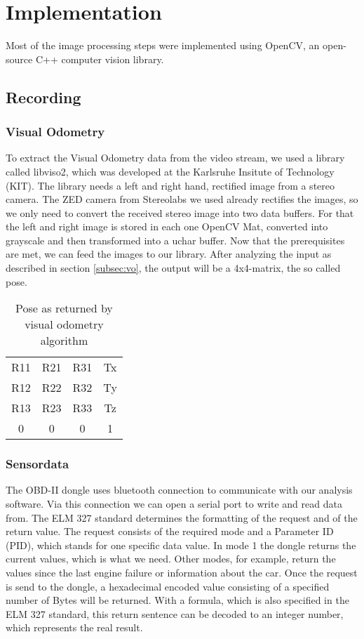 \section{Implementation}
\label{sec:implementation}

Most of the image processing steps were implemented using OpenCV, an open-source C++ computer vision library. 

\subsection{Recording}
\subsubsection{Visual Odometry}
To extract the Visual Odometry data from the video stream, we used a library called libviso2, which was developed at the Karlsruhe Insitute of Technology (KIT). The library needs a left and right hand, rectified image from a stereo camera. The ZED camera from Stereolabs we used already rectifies the images, so we only need to convert the received stereo image into two data buffers.
For that the left and right image is stored in each one OpenCV Mat, converted into grayscale and then transformed into a uchar buffer.
Now that the prerequisites are met, we can feed the images to our library.
After analyzing the input as described in section \ref{subsec:vo}, the output will be a 4x4-matrix, the so called pose.

 \begin{table}[!ht]
  \begin{center}
   \begin{tabular}{c c c c}
    R11 & R21 & R31 & Tx \\
    R12 & R22 & R32 & Ty \\
    R13 & R23 & R33 & Tz \\
    0 & 0 & 0 & 1	
   \end{tabular}
  \end{center}
  \caption{Pose as returned by visual odometry algorithm}
 \end{table}

\subsubsection{Sensordata}
The OBD-II dongle uses bluetooth connection to communicate with our analysis software. Via this connection we can open a serial port to write and read data from.
The ELM 327 standard determines the formatting of the request and of the return value.
The request consists of the required mode and a Parameter ID (PID), which stands for one specific data value. In mode 1 the dongle returns the current values, which is what we need. Other modes, for example, return the values since the last engine failure or information about the car.
Once the request is send to the dongle, a hexadecimal encoded value consisting of a specified number of Bytes will be returned. With a formula, which is also specified in the ELM 327 standard, this return sentence can be decoded to an integer number, which represents the real result.


